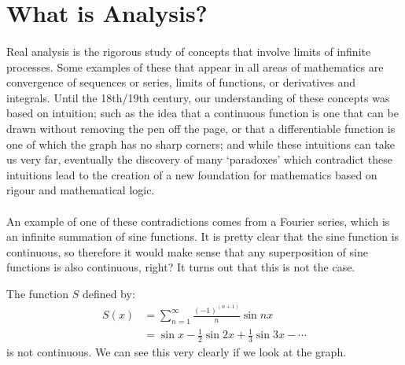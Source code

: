 \documentclass[../real_analysis.tex]{subfiles}
\begin{document}
\section{What is Analysis?}
\paragraph{}
Real analysis is the rigorous study of concepts that involve limits of infinite processes.
Some examples of these that appear in all areas of mathematics are convergence of sequences or series, limits of functions, or derivatives and integrals.
Until the 18th/19th century, our understanding of these concepts was based on intuition;
such as the idea that a continuous function is one that can be drawn without removing the pen off the page, or that a differentiable function is one of which the graph has no sharp corners;
and while these intuitions can take us very far, eventually the discovery of many `paradoxes' which contradict these intuitions lead to the creation of a new foundation for mathematics based on rigour and mathematical logic.

\paragraph{}
An example of one of these contradictions comes from a Fourier series, which is an infinite summation of sine functions.
It is pretty clear that the sine function is continuous, so therefore it would make sense that any superposition of sine functions is also continuous, right? It turns out that this is not the case.
\begin{example}
    The function $S$ defined by:
    \begin{align}
        S(x) & = \sum_{n=1}^\infty\frac{(-1)^{(n+1)}}{n}\sin{nx}        \\
             & = \sin{x}-\frac{1}{2}\sin{2x}+\frac{1}{3}\sin{3x}-\cdots
    \end{align}
    is not continuous. We can see this very clearly if we look at the graph.
\end{example}
\end{document}
